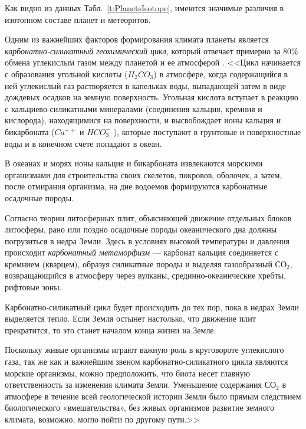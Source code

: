 \documentclass[a5paper,openany]{book}
\begin{document}
Как видно из данных Табл.~\ref{t:PlanetsIsotope}, имеются значимые различия в изотопном составе планет и метеоритов. 

Одним из важнейших факторов формирования климата планеты является \emph{карбонатно-силикатный геохимический цикл},  который отвечает примерно за 80\% обмена углекислым газом между планетой и ее атмосферой \cite{2015Planetology}. 
<<Цикл начинается с образования угольной кислоты ($H_2CO_3$) в атмосфере, когда содержащийся в ней углекислый газ растворяется в капельках воды, выпадающей затем в виде дождевых осадков на земную поверхность. Угольная кислота вступает в реакцию с кальциево-силикатными минералами (соединения кальция, кремния и кислорода), находящимися на поверхности, и высвобождает ионы кальция и бикарбоната ($Ca^{++}$ и $HCO_3^{-}$ ), которые поступают в грунтовые и поверхностные воды и в конечном счете попадают в океан.

В океанах и морях ионы кальция и бикарбоната извлекаются морскими организмами для строительства своих скелетов, покровов, оболочек, а затем, после отмирания организма, на дне водоемов формируются карбонатные осадочные породы.

Согласно теории литосферных плит, объясняющей движение отдельных блоков литосферы, рано или поздно осадочные породы океанического дна должны погрузиться в недра Земли. Здесь в условиях высокой температуры и давления происходит \emph{карбонатный метаморфизм}  --- карбонат кальция соединяется с кремнием (кварцем), образуя силикатные породы и выделяя газообразный $СО_2$, возвращающийся в атмосферу через вулканы, срединно-океанические хребты, рифтовые зоны.

Карбонатно-силикатный цикл будет происходить до тех пор, пока в недрах Земли выделяется тепло. Если Земля остынет настолько, что движение плит прекратится, то это станет началом конца жизни на Земле.

Поскольку живые организмы играют важную роль в круговороте углекислого газа, так же как и важнейшим звеном карбонатно-силикатного цикла являются морские организмы, можно предположить, что биота несет главную ответственность за изменения климата Земли. Уменьшение содержания $СО_2$ в атмосфере в течение всей геологической истории Земли было прямым следствием биологического «вмешательства», без живых организмов развитие земного климата, возможно, могло пойти по другому пути.>>
\end{document}
